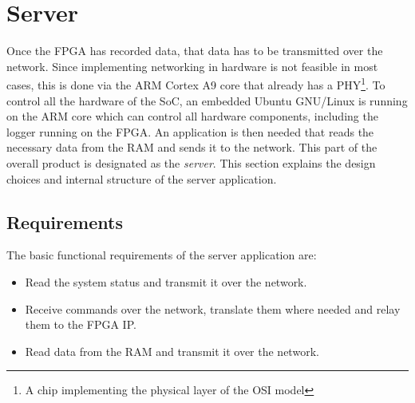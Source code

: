 %
%
\chapter{Server} %
\label{ch:server}

Once the  FPGA has  recorded data, that  data has to  be transmitted  over the
network. Since implementing  networking in  hardware is  not feasible  in most
cases,  this  is  done  via  the  ARM  Cortex  A9  core  that  already  has  a
PHY\footnote{
    A chip implementing the physical layer of the OSI model%
}.
To  control all  the hardware  of  the SoC,  an embedded  Ubuntu GNU/Linux  is
running on the  ARM core which can control all  hardware components, including
the logger running on the FPGA.  An  application is then needed that reads the
necessary data  from the  RAM and sends  it to the  network. This part  of the
overall product is designated as  the \emph{server}. This section explains the
design choices and internal structure of the server application.
\section{Requirements} %
\label{sec:server:requirements}

The basic functional requirements of the server application are:
\begin{itemize}\tightlist
    \item
        Read the system status and transmit it over the network.
    \item
        Receive commands  over the  network, translate  them where  needed and
        relay them to the FPGA IP.
    \item
        Read data from the RAM and transmit it over the network.
\end{itemize}

%
%
